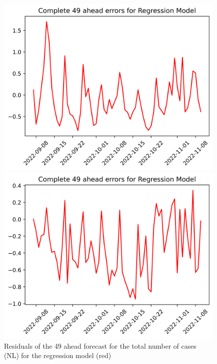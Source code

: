\begin{figure}

\begin{minipage}{.32\textwidth}
  \centering
  \includegraphics[width=\linewidth]{pics/49_ah/49_ahead_errors_Regression Model.png}
  \caption{Residuals of the 49 ahead forecast for the total number of cases (NL) for the regression model (red)}
  \label{fig:tot_cases_error_49_RM}
\end{minipage}
\begin{minipage}{.32\textwidth}
  \centering
  \includegraphics[width=\linewidth]{pics/49_ah/DE_49_ahead_errors_Regression Model.png}

\end{minipage}
\end{figure}
